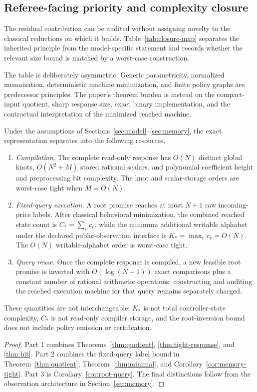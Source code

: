 \subsection{Referee-facing priority and complexity closure}\label{sec:closure-map}
The residual contribution can be audited without assigning novelty to the classical reductions on which it builds. Table~\ref{tab:closure-map} separates the inherited principle from the model-specific statement and records whether the relevant size bound is matched by a worst-case construction.



The table is deliberately asymmetric. Generic parametricity, normalized memoization, deterministic machine minimization, and finite policy graphs are predecessor principles. The paper's theorem burden is instead on the compact-input quotient, sharp response size, exact binary implementation, and the contractual interpretation of the minimized reached machine.

\begin{proposition}\label{prop:three-layer-accounting}
Under the assumptions of Sections~\ref{sec:model}--\ref{sec:memory}, the exact representation separates into the following resources.
\begin{enumerate}
\item \emph{Compilation.} The complete read-only response has $O(N)$ distinct global knots, $O(N^2+M)$ stored rational scalars, and polynomial coefficient height and preprocessing bit complexity. The knot and scalar-storage orders are worst-case tight when $M=O(N)$.
\item \emph{Fixed-query execution.} A root promise reaches at most $N+1$ raw incoming-price labels. After classical behavioral minimization, the combined reached state count is $C_*=\sum_v c_v$, while the minimum additional writable alphabet under the declared public-observation interface is $K_*=\max_v c_v=O(N)$. The $O(N)$ writable-alphabet order is worst-case tight.
\item \emph{Query reuse.} Once the complete response is compiled, a new feasible root promise is inverted with $O(\log(N+1))$ exact comparisons plus a constant number of rational arithmetic operations; constructing and auditing the reached execution machine for that query remains separately charged.
\end{enumerate}
These quantities are not interchangeable: $K_*$ is not total controller-state complexity, $C_*$ is not read-only compiler storage, and the root-inversion bound does not include policy emission or certification.
\end{proposition}
\begin{proof}
Part 1 combines Theorems~\ref{thm:quotient}, \ref{thm:tight-response}, and \ref{thm:bit}. Part 2 combines the fixed-query label bound in Theorem~\ref{thm:quotient}, Theorem~\ref{thm:minimal}, and Corollary~\ref{cor:memory-tight}. Part 3 is Corollary~\ref{cor:root-query}. The final distinctions follow from the observation architecture in Section~\ref{sec:memory}.
\end{proof}

